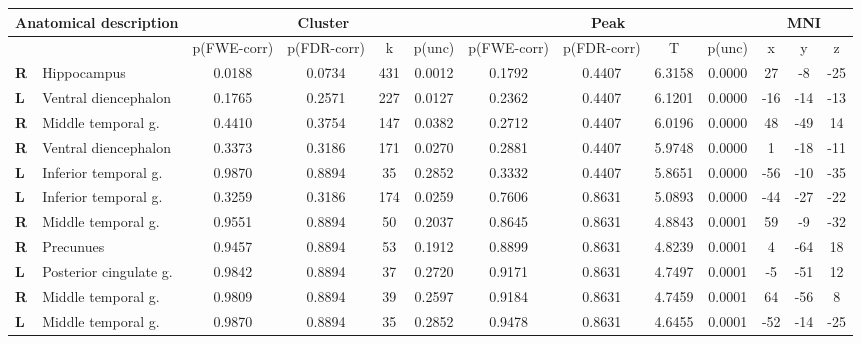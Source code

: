 \begin{landscape}
\begin{table}[!ht]
    \vspace*{-4cm}
    \raggedright
    \begin{tabular}{ll|cccc|cccc|ccc} \\ \hline
        \multicolumn{2}{l}{\textbf{Anatomical description}} & \multicolumn{4}{c}{\textbf{Cluster}} & \multicolumn{4}{c}{\textbf{Peak}} &  \multicolumn{3}{c}{\textbf{MNI}} \\ \hline
        \multicolumn{2}{l}{\textbf{}} & \multicolumn{1}{l}{p(FWE-corr)} & p(FDR-corr) & k & \multicolumn{1}{l}{p(unc)} & p(FWE-corr) & p(FDR-corr) & T & \multicolumn{1}{l}{p(unc)} & x & y & z \\ \hline
        \textbf{R} & Hippocampus & 0.0188 & 0.0734 & 431 & 0.0012 & 0.1792 & 0.4407 & 6.3158 & 0.0000 & 27 & -8 & -25 \\ 
        \textbf{L} & Ventral diencephalon & 0.1765 & 0.2571 & 227 & 0.0127 & 0.2362 & 0.4407 & 6.1201 & 0.0000 & -16 & -14 & -13 \\ 
        \textbf{R} & Middle temporal g. & 0.4410 & 0.3754 & 147 & 0.0382 & 0.2712 & 0.4407 & 6.0196 & 0.0000 & 48 & -49 & 14 \\ 
        \textbf{R} & Ventral diencephalon & 0.3373 & 0.3186 & 171 & 0.0270 & 0.2881 & 0.4407 & 5.9748 & 0.0000 & 1 & -18 & -11 \\ 
        \textbf{L} & Inferior temporal g. & 0.9870 & 0.8894 & 35 & 0.2852 & 0.3332 & 0.4407 & 5.8651 & 0.0000 & -56 & -10 & -35 \\ 
        \textbf{L} & Inferior temporal g. & 0.3259 & 0.3186 & 174 & 0.0259 & 0.7606 & 0.8631 & 5.0893 & 0.0000 & -44 & -27 & -22 \\ 
        \textbf{R} & Middle temporal g. & 0.9551 & 0.8894 & 50 & 0.2037 & 0.8645 & 0.8631 & 4.8843 & 0.0001 & 59 & -9 & -32 \\ 
        \textbf{R} & Precunues & 0.9457 & 0.8894 & 53 & 0.1912 & 0.8899 & 0.8631 & 4.8239 & 0.0001 & 4 & -64 & 18 \\ 
        \textbf{L} & Posterior cingulate g. & 0.9842 & 0.8894 & 37 & 0.2720 & 0.9171 & 0.8631 & 4.7497 & 0.0001 & -5 & -51 & 12 \\ 
        \textbf{R} & Middle temporal g. & 0.9809 & 0.8894 & 39 & 0.2597 & 0.9184 & 0.8631 & 4.7459 & 0.0001 & 64 & -56 & 8 \\ 
        \textbf{L} & Middle temporal g. & 0.9870 & 0.8894 & 35 & 0.2852 & 0.9478 & 0.8631 & 4.6455 & 0.0001 & -52 & -14 & -25 \\ 

\end{tabular}
\end{table}
\end{landscape}
